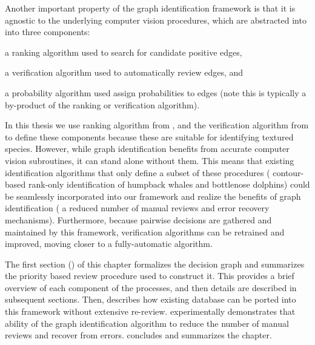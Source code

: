 Another important property of the graph identification framework is that it is agnostic to the underlying computer
vision procedures, which are abstracted into into three components:
\begin{enumin}
\item a ranking algorithm used to search for candidate positive edges, %
\item a verification algorithm used to automatically review edges, and %
\item a probability algorithm used assign probabilities to edges (note this is typically a by-product of the ranking or
verification algorithm).
\end{enumin}
In this thesis we use ranking algorithm from , and the verification algorithm from
 to define these components because these are suitable for identifying textured species.  However,
while graph identification benefits from accurate computer vision subroutines, it can stand alone without them.  This
means that existing identification algorithms that only define a subset of these procedures (\eg{} contour-based
rank-only identification of humpback whales and bottlenose dolphins) could be seamlessly incorporated into our framework
and realize the benefits of graph identification (\eg{} a reduced number of manual reviews and error recovery
mechanisms).  Furthermore, because pairwise decisions are gathered and maintained by this framework, verification
algorithms can be retrained and improved, moving closer to a fully-automatic algorithm.


The first section () of this chapter formalizes the
  decision graph and summarizes the priority based review procedure used to
  construct it.
This provides a brief overview of each component of the processes, and then
  details are described in subsequent sections.
Then,  describes how existing database can be ported into
  this framework without extensive re-review.
 experimentally demonstrates that ability of the graph
  identification algorithm to reduce the number of manual reviews and recover
  from errors.
 concludes and summarizes the chapter.



